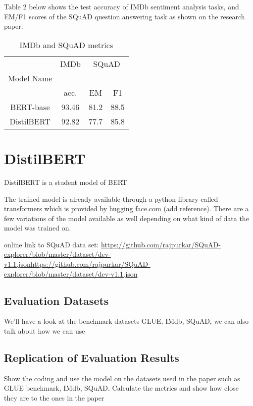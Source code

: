 \documentclass[
  11pt,
]{article}
\begin{document}
Table 2 below shows the test accuracy of IMDb sentiment analysis tasks,
and EM/F1 scores of the SQuAD question answering task as shown on the
research paper.

\begin{longtable}[t]{cccc}
\caption{\label{tab:table2}IMDb and SQuAD metrics}\\
\toprule
\multicolumn{1}{c}{ } & \multicolumn{1}{c}{IMDb} & \multicolumn{2}{c}{SQuAD} \\
\cmidrule(l{3pt}r{3pt}){2-2} \cmidrule(l{3pt}r{3pt}){3-4}
Model Name &  &  & \\
\midrule
 & acc. & EM & F1\\
BERT-base & 93.46 & 81.2 & 88.5\\
DistilBERT & 92.82 & 77.7 & 85.8\\
\bottomrule
\end{longtable}

\section{DistilBERT}\label{distilbert}

DistilBERT is a student model of BERT

The trained model is already available through a python library called
transformers which is provided by hugging face.com (add reference).
There are a few variations of the model available as well depending on
what kind of data the model was trained on.

online link to SQuAD data set:
\href{https://github.com/rajpurkar/SQuAD-explorer/blob/master/dataset/dev-v1.1.json}{https://github.com/rajpurkar/SQuAD-explorer/blob/master/dataset/dev-v1.1.jsonhttps://github.com/rajpurkar/SQuAD-explorer/blob/master/dataset/dev-v1.1.json}

\subsection{Evaluation Datasets}\label{evaluation-datasets}

We'll have a look at the benchmark datasets GLUE, IMdb, SQuAD, we can
also talk about how we can use

\subsection{Replication of Evaluation
Results}\label{replication-of-evaluation-results}

Show the coding and use the model on the datasets used in the paper such
as GLUE benchmark, IMdb, SQuAD. Calculate the metrics and show how close
they are to the ones in the paper
\end{document}
